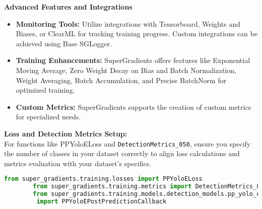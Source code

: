 \begin{enumerate}
    \textbf{Advanced Features and Integrations}\\
    \begin{itemize}
        \item \textbf{Monitoring Tools: } Utilize integrations with Tensorboard, Weights and Biases, or ClearML for tracking training progress. Custom integrations can be achieved using Base SGLogger.
        \item \textbf{Training Enhancements: } SuperGradients offers features like Exponential Moving Average, Zero Weight Decay on Bias and Batch Normalization, Weight Averaging, Batch Accumulation, and Precise BatchNorm for optimized training.
        \item \textbf{Custom Metrics: } SuperGradients supports the creation of custom metrics for specialized needs.
    \end{itemize}
    
    \textbf{Loss and Detection Metrics Setup: }\\
    For functions like PPYoloELoss and \texttt{DetectionMetrics\_050}, ensure you specify the number of classes in your dataset correctly to align loss calculations and metrics evaluation with your dataset’s specifics.
    
    \begin{lstlisting}[language=Python]
        from super_gradients.training.losses import PPYoloELoss
        from super_gradients.training.metrics import DetectionMetrics_050
        from super_gradients.training.models.detection_models.pp_yolo_e 
         import PPYoloEPostPredictionCallback
        

\end{lstlisting}
\end{enumerate}
